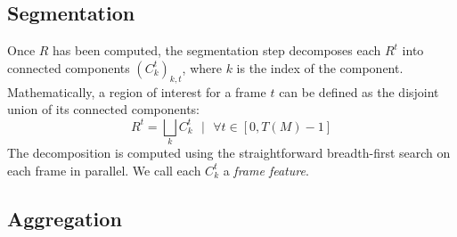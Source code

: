 \subsection{Segmentation}\label{sec:features:segmentation}
Once $R$ has been computed, the segmentation step decomposes each $R^t$ into connected components $(C_k^t)_{k,t}$, where $k$ is the index of the component. Mathematically, a region of interest for a frame $t$ can be defined as the disjoint union of its connected components:
\begin{equation}
 R^t = \bigsqcup_k C_k^t \text{~~} \vert \text{~~} \forall t \in [0, T(M)-1]
\end{equation}
The decomposition is computed using the straightforward breadth-first search on each frame in parallel. 
We call each $C_{k}^{t}$ a \emph{frame feature}.

\subsection{Aggregation}\label{sec:features:aggregation}

